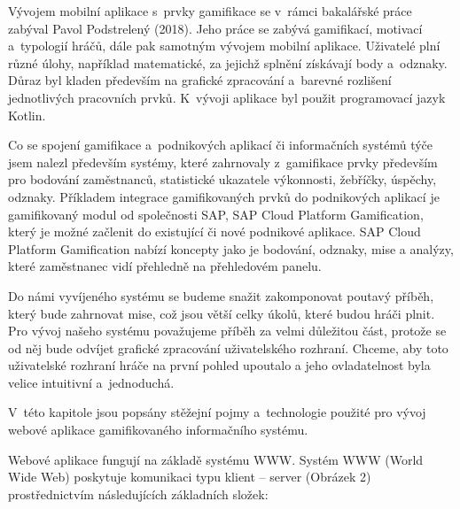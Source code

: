 \documentclass[twoside, 12pt]{article}
\begin{document}
\par

Vývojem mobilní aplikace s~prvky gamifikace se v~rámci bakalářské práce zabýval Pavol Podstrelený (2018).
Jeho práce se zabývá gamifikací, motivací a~typologií hráčů, dále pak samotným vývojem mobilní aplikace.
Uživatelé plní různé úlohy, například matematické, za jejichž splnění získávají body a~odznaky.
Důraz byl kladen především na grafické zpracování a~barevné rozlišení jednotlivých pracovních prvků.
K~vývoji aplikace byl použit programovací jazyk Kotlin.

\par

Co se spojení gamifikace a~podnikových aplikací či informačních systémů týče jsem nalezl především systémy,
které zahrnovaly z~gamifikace prvky především pro bodování zaměstnanců, statistické ukazatele výkonnosti, žebříčky, úspěchy, odznaky.
Příkladem integrace gamifikovaných prvků do podnikových aplikací je gamifikovaný modul od společnosti SAP, SAP Cloud Platform Gamification,
který je možné začlenit do existující či nové podnikové aplikace.
SAP Cloud Platform Gamification nabízí koncepty jako je bodování,
odznaky, mise a analýzy, které zaměstnanec vidí přehledně na přehledovém panelu.

\par
Do námi vyvíjeného systému se budeme snažit zakomponovat poutavý příběh,
který bude zahrnovat mise, což jsou větší celky úkolů, které budou hráči plnit.
Pro vývoj našeho systému považujeme příběh za velmi důležitou část,
protože se od něj bude odvíjet grafické zpracování uživatelského rozhraní.
Chceme, aby toto uživatelské rozhraní hráče na první pohled upoutalo
a jeho ovladatelnost byla velice intuitivní a~jednoduchá.

\par


V~této kapitole jsou popsány stěžejní pojmy a~technologie použité pro vývoj webové aplikace
gamifikovaného informačního systému.

Webové aplikace fungují na základě systému WWW.
Systém WWW (World Wide Web) poskytuje komunikaci typu klient -- server (Obrázek 2)
prostřednictvím následujících základních složek:
\end{document}
